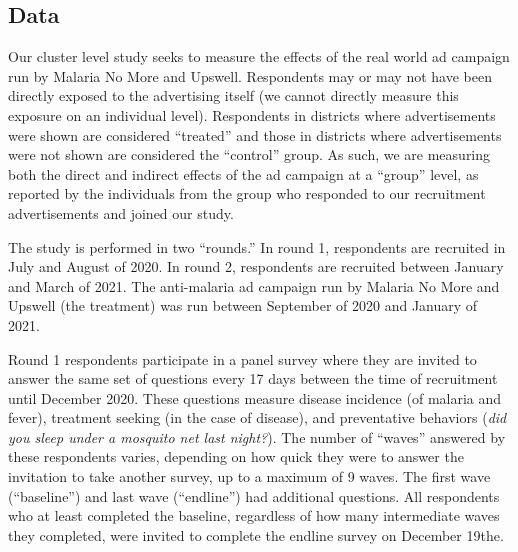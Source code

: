\documentclass[a4paper,12pt]{article}
\begin{document}






\subsection{Data}

Our cluster level study seeks to measure the effects of the real world ad campaign run by Malaria No More and Upswell. Respondents may or may not have been directly exposed to the advertising itself (we cannot directly measure this exposure on an individual level). Respondents in districts where advertisements were shown are considered ``treated'' and those in districts where advertisements were not shown are considered the ``control'' group. As such, we are measuring both the direct and indirect effects of the ad campaign at a ``group'' level, as reported by the individuals from the group who responded to our recruitment advertisements and joined our study.

The study is performed in two ``rounds.'' In round 1, respondents are recruited in July and August of 2020. In round 2, respondents are recruited between January and March of 2021. The anti-malaria ad campaign run by Malaria No More and Upswell (the treatment) was run between September of 2020 and January of 2021.

Round 1 respondents participate in a panel survey where they are invited to answer the same set of questions every 17 days between the time of recruitment until December 2020. These questions measure disease incidence (of malaria and fever), treatment seeking (in the case of disease), and preventative behaviors (\textit{did you sleep under a mosquito net last night?}). The number of ``waves'' answered by these respondents varies, depending on how quick they were to answer the invitation to take another survey, up to a maximum of 9 waves. The first wave (``baseline'') and last wave (``endline'') had additional questions. All respondents who at least completed the baseline, regardless of how many intermediate waves they completed, were invited to complete the endline survey on December 19the.
\end{document}
